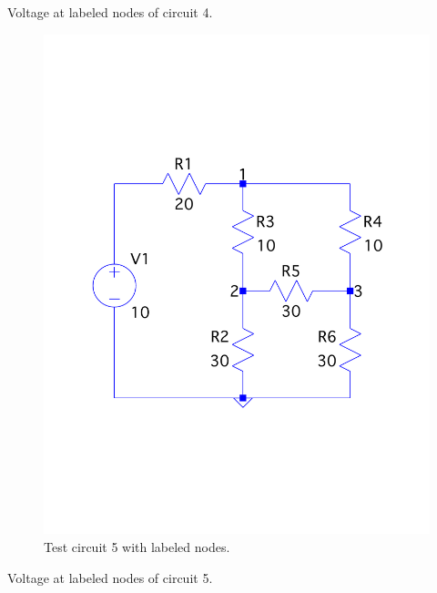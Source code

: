\documentclass[a4paper,titlepage]{article}
\begin{document}
	\begin{table}[!htb]
		\centering
		\caption{Voltage at labeled nodes of circuit 4.}
		\label{table:q1_circuit_4}
	\end{table}
	
	\begin{figure}[!htb]
		\centering
		\includegraphics[width=0.75\columnwidth]{plots/q1_circuit_5.pdf}
		\caption
		{Test circuit 5 with labeled nodes.}
		\label{fig:q1_circuit_5}
	\end{figure}
	
	\begin{table}[!htb]
		\centering
		\caption{Voltage at labeled nodes of circuit 5.}
		\label{table:q1_circuit_5}
	\end{table}
	
\end{document}
